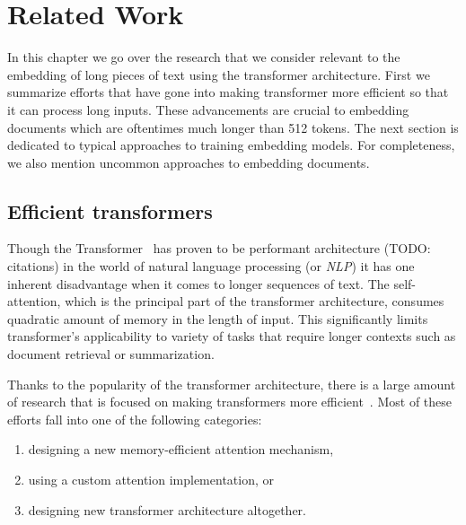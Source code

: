 \chapter{Related Work}


In this chapter we go over the research that we consider relevant to the
embedding of long pieces of text using the transformer architecture. First we
summarize efforts that have gone into making transformer more efficient so that
it can process long inputs. These advancements are crucial to embedding
documents which are oftentimes much longer than 512 tokens. The next section is
dedicated to typical approaches to training embedding models. For completeness,
we also mention uncommon approaches to embedding documents.

\section{Efficient transformers}


Though the Transformer~\cite{vaswani2017attention} has proven to be performant
architecture (TODO: citations) in the world of natural language processing (or
\emph{NLP}) it has one inherent disadvantage when it comes to longer sequences
of text. The self-attention, which is the principal part of the transformer
architecture, consumes quadratic amount of memory in the length of input. This
significantly limits transformer's applicability to variety of tasks that
require longer contexts such as document retrieval or summarization.

Thanks to the popularity of the transformer architecture, there is a large
amount of research that is focused on making transformers more
efficient~\cite{tay2022efficient}. Most of these efforts fall into one of the
following categories:

\begin{enumerate}

    \item designing a new memory-efficient attention mechanism,

    \item using a custom attention implementation, or

    \item designing new transformer architecture altogether.

\end{enumerate}

